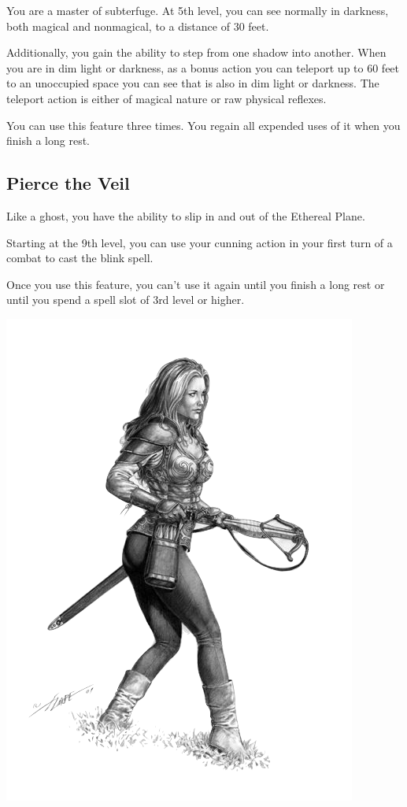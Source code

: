 \begin{multicols*}{2}
You are a master of subterfuge. At 5th level, you can see normally in darkness, both magical and nonmagical, to a distance of 30 feet.

Additionally, you gain the ability to step from one shadow into another. When you are in dim light or darkness, as a bonus action you can teleport up to 60 feet to an unoccupied space you can see that is also in dim light or darkness. The teleport action is either of magical nature or raw physical reflexes. 

You can use this feature three times. You regain all expended uses of it when you finish a long rest.

\subsection*{Pierce the Veil}

Like a ghost, you have the ability to slip in and out of the Ethereal Plane.

Starting at the 9th level, you can use your cunning action in your first turn of a combat to cast the blink spell.

Once you use this feature, you can’t use it again until you finish a long rest or until you spend a spell slot of 3rd level or higher.

\begin{Figure}
\centering
\includegraphics[width=\textwidth]{img/female-rogue.png}
\end{Figure}
    
\end{multicols*}


